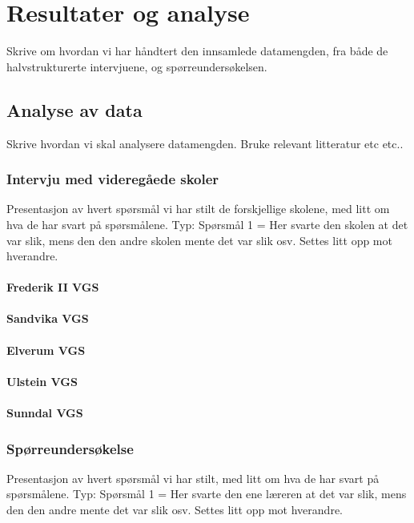 \cleardoublepage
\chapter{Resultater og analyse}

{ \color{red} Skrive om hvordan vi har håndtert den innsamlede datamengden, fra både de halvstrukturerte intervjuene, og spørreundersøkelsen.}

\section{Analyse av data}

{ \color{red} Skrive hvordan vi skal analysere datamengden. Bruke relevant litteratur etc etc..}


\subsection {Intervju med videregåede skoler}

{\color{red} Presentasjon av hvert spørsmål vi har stilt de forskjellige skolene, med litt om hva de har svart på spørsmålene. Typ: Spørsmål 1 = Her svarte den skolen at det var slik, mens den den andre skolen mente det var slik osv. Settes litt opp mot hverandre.
}

\subsubsection{Frederik II VGS}
\subsubsection{Sandvika VGS}
\subsubsection{Elverum VGS}
\subsubsection{Ulstein VGS}
\subsubsection{Sunndal VGS}

\subsection{Spørreundersøkelse}

{\color{red}Presentasjon av hvert spørsmål vi har stilt, med litt om hva de har svart på spørsmålene. Typ: Spørsmål 1 = Her svarte den ene læreren at det var slik, mens den den andre mente det var slik osv. Settes litt opp mot hverandre. }

